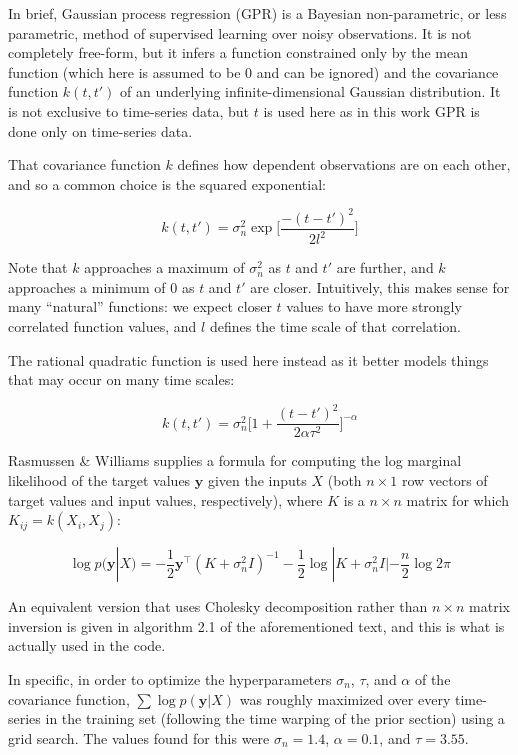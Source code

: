 \documentclass[journal]{IEEEtran}
\begin{document}
In brief, Gaussian process regression (GPR) is a Bayesian
non-parametric, or less parametric, method of supervised learning over
noisy observations\cite{Ebden2015,Lasko2013,Rasmussen2004}.  It is not
completely free-form, but it infers a function constrained only by the
mean function (which here is assumed to be 0 and can be ignored) and
the covariance function $k(t,t')$ of an underlying
infinite-dimensional Gaussian distribution.  It is not exclusive to
time-series data, but $t$ is used here as in this work GPR is done
only on time-series data.

That covariance function $k$ defines how dependent observations are on
each other, and so a common choice is the squared
exponential\cite{Ebden2015}:

$$k(t,t') = \sigma_n^2\exp\bigg[\frac{-(t-t')^2}{2l^2}\bigg]$$

Note that $k$ approaches a maximum of $\sigma_n^2$ as $t$ and $t'$ are
further, and $k$ approaches a minimum of 0 as $t$ and $t'$ are closer.
Intuitively, this makes sense for many ``natural'' functions: we
expect closer $t$ values to have more strongly correlated function
values, and $l$ defines the time scale of that correlation.

The rational quadratic function is used here instead as it better
models things that may occur on many time scales\cite{Lasko2013}:

$$k(t,t') = \sigma_n^2\bigg[1+\frac{(t-t')^2}{2\alpha\tau^2}\bigg]^{-\alpha}$$

Rasmussen \& Williams\cite{Rasmussen2004} supplies a formula for
computing the log marginal likelihood of the target values
$\mathbf{y}$ given the inputs $X$ (both $n\times1$ row vectors of
target values and input values, respectively), where $K$ is a $n\times
n$ matrix for which $K_{ij}=k(X_i,X_j)$:

$$\log p(\mathbf{y}|X) = -\frac{1}{2}\mathbf{y}^\top(K+\sigma_n^2I)^{-1}-\frac{1}{2}\log |K+\sigma_n^2I|-\frac{n}{2}\log2\pi$$

An equivalent version that uses Cholesky decomposition rather than
$n\times n$ matrix inversion is given in algorithm 2.1 of the
aforementioned text, and this is what is actually used in the code.

In specific, in order to optimize the hyperparameters $\sigma_n$,
$\tau$, and $\alpha$ of the covariance function, $\sum\log
p(\mathbf{y}|X)$ was roughly maximized over every time-series in the
training set (following the time warping of the prior section) using a
grid search.  The values found for this were $\sigma_n=1.4$,
$\alpha=0.1$, and $\tau=3.55$.
\end{document}

